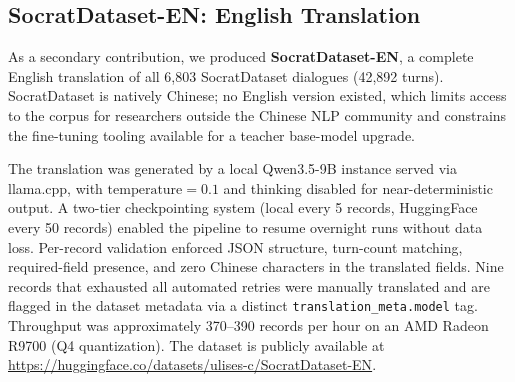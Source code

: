 \documentclass[11pt]{article}
\begin{document}
\subsection{SocratDataset-EN: English Translation}
\label{sec:dataset-en}

As a secondary contribution, we produced \textbf{SocratDataset-EN}, a complete English translation of all 6,803 SocratDataset dialogues (42,892 turns). SocratDataset is natively Chinese; no English version existed, which limits access to the corpus for researchers outside the Chinese NLP community and constrains the fine-tuning tooling available for a teacher base-model upgrade.

The translation was generated by a local Qwen3.5-9B instance served via llama.cpp, with $\text{temperature}=0.1$ and thinking disabled for near-deterministic output. A two-tier checkpointing system (local every 5 records, HuggingFace every 50 records) enabled the pipeline to resume overnight runs without data loss. Per-record validation enforced JSON structure, turn-count matching, required-field presence, and zero Chinese characters in the translated fields. Nine records that exhausted all automated retries were manually translated and are flagged in the dataset metadata via a distinct \texttt{translation\_meta.model} tag. Throughput was approximately 370--390 records per hour on an AMD Radeon R9700 (Q4 quantization). The dataset is publicly available at \url{https://huggingface.co/datasets/ulises-c/SocratDataset-EN}.
\end{document}
